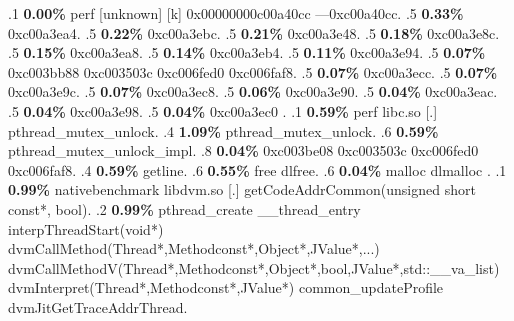 \begin{profile}
{.1 \textbf{ 0.00\%} perf             [unknown]              [k] 0x00000000c00a40cc\newline {} ---0xc00a40cc. 
.5 \textbf{0.33\%} 0xc00a3ea4. 
.5 \textbf{0.22\%} 0xc00a3ebc. 
.5 \textbf{0.21\%} 0xc00a3e48. 
.5 \textbf{0.18\%} 0xc00a3e8c. 
.5 \textbf{0.15\%} 0xc00a3ea8. 
.5 \textbf{0.14\%} 0xc00a3eb4. 
.5 \textbf{0.11\%} 0xc00a3e94. 
.5 \textbf{0.07\%} 0xc003bb88\newline {} 0xc003503c\newline {} 0xc006fed0\newline {} 0xc006faf8. 
.5 \textbf{0.07\%} 0xc00a3ecc. 
.5 \textbf{0.07\%} 0xc00a3e9c. 
.5 \textbf{0.07\%} 0xc00a3ec8. 
.5 \textbf{0.06\%} 0xc00a3e90. 
.5 \textbf{0.04\%} 0xc00a3eac. 
.5 \textbf{0.04\%} 0xc00a3e98. 
.5 \textbf{0.04\%} 0xc00a3ec0\newline {} . 
.1 \textbf{ 0.59\%} perf             libc.so                [.] pthread\_mutex\_unlock. 
.4 \textbf{1.09\%} pthread\_mutex\_unlock. 
.6 \textbf{0.59\%} pthread\_mutex\_unlock\_impl. 
.8 \textbf{0.04\%} 0xc003be08\newline {} 0xc003503c\newline {} 0xc006fed0\newline {} 0xc006faf8. 
.4 \textbf{0.59\%} getline. 
.6 \textbf{0.55\%} free\newline {} dlfree. 
.6 \textbf{0.04\%} malloc\newline {} dlmalloc\newline {} . 
.1 \textbf{ 0.99\%} nativebenchmark  libdvm.so              [.] getCodeAddrCommon(unsigned short const*, bool). 
.2 \textbf{0.99\%} pthread\_create\newline {} \_\_thread\_entry\newline {} interpThreadStart(void*)\newline {} dvmCallMethod(Thread*,Methodconst*,Object*,JValue*,...)\newline {} dvmCallMethodV(Thread*,Methodconst*,Object*,bool,JValue*,std::\_\_va\_list)\newline {} dvmInterpret(Thread*,Methodconst*,JValue*)\newline {} common\_updateProfile\newline {} dvmJitGetTraceAddrThread. 
}
\end{profile}
